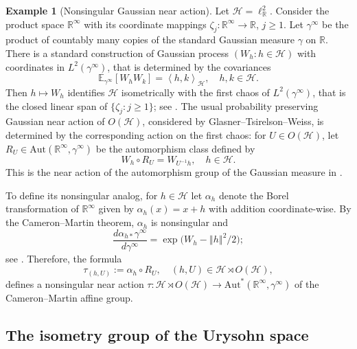 \documentclass{amsart}
\numberwithin{equation}{subsection}
\theoremstyle{plain}
\theoremstyle{definition}
\newtheorem{exm}[exm]{Example}
\theoremstyle{plain}
\begin{document}
\begin{exm}[Nonsingular Gaussian near action]\label{exm:CamMar}
Let \(\mathcal{H}=\ell_{\mathbb{R}}^{2}\). Consider the product space \(\mathbb{R}^{\infty}\) with its coordinate mappings \(\zeta_{j}:\mathbb{R}^{\infty}\to\mathbb{R}\), \(j\geq 1\). Let \(\gamma^{\infty}\) be the product of countably many copies of the standard Gaussian measure \(\gamma\) on \(\mathbb{R}\). There is a standard construction of Gaussian process \(\left(W_{h}:h\in\mathcal{H}\right)\) with coordinates in \(L^{2}\left(\gamma^{\infty}\right)\), that is determined by the covariances
\[\mathbb{E}_{\gamma^{\infty}}\left[W_{h}W_{k}\right]=\left\langle h,k\right\rangle_{\mathcal{H}},\quad h,k\in\mathcal{H}.\]
Then \(h\mapsto W_{h}\) identifies \(\mathcal{H}\) isometrically with the first chaos of \(L^{2}\left(\gamma^{\infty}\right)\), that is the closed linear span of \(\{\zeta_{j}:j\geq 1\}\); see \cite[Chs.~1--2]{Janson1997}. The usual probability preserving Gaussian near action of \(O\left(\mathcal{H}\right)\), considered by Glasner--Tsirelson--Weiss, is determined by the corresponding action on the first chaos: for \(U\in O\left(\mathcal{H}\right)\), let \(R_{U}\in\mathrm{Aut}\left(\mathbb{R}^{\infty},\gamma^{\infty}\right)\) be the automorphism class defined by
\[W_{h}\circ R_{U}=W_{U^{-1}h},\quad h\in\mathcal{H}.\]
This is the near action of the automorphism group of the Gaussian measure in \cite[\S4]{glasner2005automorphism}.

\smallskip

To define its nonsingular analog, for \(h\in\mathcal{H}\) let \(\alpha_{h}\) denote the Borel transformation of \(\mathbb{R}^{\infty}\) given by \(\alpha_{h}\left(x\right)=x+h\) with addition coordinate-wise. By the Cameron--Martin theorem, \(\alpha_{h}\) is nonsingular and
\[\frac{d\alpha_{h\ast}\gamma^{\infty}}{d\gamma^{\infty}}=\exp\big(W_{h}-\left\Vert h\right\Vert^{2}/2\big);\]
see \cite[Ch.~2, \S4]{Bogachev1998}. Therefore, the formula
\[\tau_{\left(h,U\right)}:=\alpha_{h}\circ R_{U},\quad \left(h,U\right)\in\mathcal{H}\rtimes O\left(\mathcal{H}\right),\]
defines a nonsingular near action \(\tau:\mathcal{H}\rtimes O\left(\mathcal{H}\right)\to\mathrm{Aut}^{\ast}\left(\mathbb{R}^{\infty},\gamma^{\infty}\right)\) of the Cameron--Martin affine group.
\end{exm}

\subsection{The isometry group of the Urysohn space}
\end{document}
